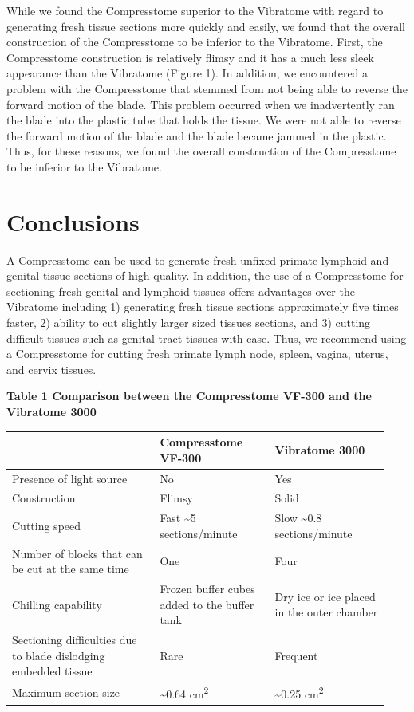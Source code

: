 \documentclass{article}
\begin{document}
While we found the Compresstome superior to the Vibratome with regard to generating fresh tissue sections more quickly and easily, we found that the overall construction of the Compresstome to be inferior to the Vibratome. First, the Compresstome construction is relatively flimsy and it has a much less sleek appearance than the Vibratome (Figure 1). In addition, we encountered a problem with the Compresstome that stemmed from not being able to reverse the forward motion of the blade. This problem occurred when we inadvertently ran the blade into the plastic tube that holds the tissue. We were not able to reverse the forward motion of the blade and the blade became jammed in the plastic. Thus, for these reasons, we found the overall construction of the Compresstome to be inferior to the Vibratome.

\section*{Conclusions}

A Compresstome can be used to generate fresh unfixed primate lymphoid and genital tissue sections of high quality. In addition, the use of a Compresstome for sectioning fresh genital and lymphoid tissues offers advantages over the Vibratome including 1) generating fresh tissue sections approximately five times faster, 2) ability to cut slightly larger sized tissues sections, and 3) cutting difficult tissues such as genital tract tissues with ease. Thus, we recommend using a Compresstome for cutting fresh primate lymph node, spleen, vagina, uterus, and cervix tissues.

\noindent \textbf{Table 1 Comparison between the Compresstome VF-300 and the Vibratome 3000}
\begin{center}\small
\begin{tabular}{@{}p{0.36\linewidth}p{0.29\linewidth}p{0.29\linewidth}@{}}
\toprule
 & \textbf{Compresstome VF-300} & \textbf{Vibratome 3000}\\
\midrule
Presence of light source & No & Yes\\
Construction & Flimsy & Solid\\
Cutting speed & Fast \textasciitilde{}5 sections/minute & Slow \textasciitilde{}0.8 sections/minute\\
Number of blocks that can be cut at the same time & One & Four\\
Chilling capability & Frozen buffer cubes added to the buffer tank & Dry ice or ice placed in the outer chamber\\
Sectioning difficulties due to blade dislodging embedded tissue & Rare & Frequent\\
Maximum section size & \textasciitilde{}0.64 cm\textsuperscript{2} & \textasciitilde{}0.25 cm\textsuperscript{2}\\
\bottomrule
\end{tabular}
\end{center}
\end{document}

